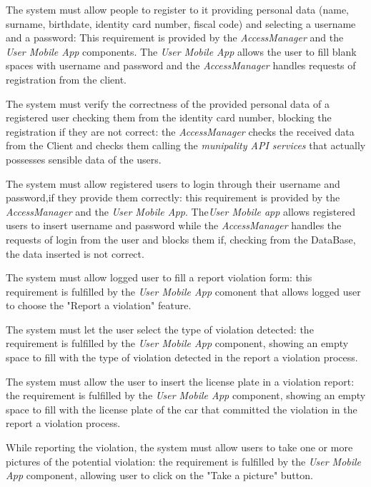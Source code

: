 \documentclass[a4paper]{report}
\begin{document}
\begin{enumerate}[start=1,label={[R\arabic*]}]
\item \label{[R1]} The system must allow people to register to it providing personal data (name, surname, birthdate, identity card number, fiscal code) and selecting a username and a password: This requirement is provided by the \textit{AccessManager} and the \textit{User Mobile App} components. The \textit{User Mobile App} allows the user to fill blank spaces with username and password and the \textit{AccessManager} handles requests of registration from the client.
\item \label{[R2]} The system must verify the correctness of the provided personal data of a registered user checking them from the identity card number, blocking the registration if they are not correct: the \textit{AccessManager} checks the received data from the Client and checks them calling the \textit{munipality API services} that actually possesses sensible data of the users. 
\item  \label{[R3]}The system must allow registered users to login through their username and password,if they provide them correctly: this requirement is provided by the \textit{AccessManager} and the \textit{User Mobile App}. The\textit{User Mobile app} allows registered users to insert username and password while the \textit{AccessManager} handles the requests of login from the user and blocks them  if, checking from the DataBase, the data inserted is not correct. 
\item \label{[R4]} The system must allow logged user to fill a report violation form: this requirement is fulfilled by the \textit{User Mobile App} comonent that allows logged user to choose the "Report a violation" feature.
\item  \label{[R5]}The system must let the user select the type of violation detected: the requirement is fulfilled by the \textit{User Mobile App} component, showing an empty space to fill with the type of violation detected in the report a violation process.
\item  \label{[R6]} The system must allow the user to insert the license plate in a violation report:  the requirement is fulfilled by the \textit{User Mobile App} component, showing an empty space to fill with the license plate of the car that committed the violation in the report a violation process.
\item  \label{[R7]}While reporting the violation, the system must allow users to take one or more pictures of the potential violation: the requirement is fulfilled by the \textit{User Mobile App} component, allowing user to click on the "Take a picture" button.

\end{enumerate}
\end{document}
